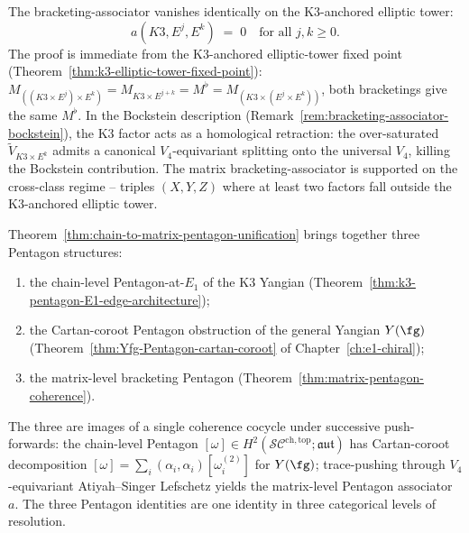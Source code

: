 \begin{remark}
\label{rem:K3-anchored-bracketing-rigidity}
The bracketing-associator vanishes identically on the K$3$-anchored
elliptic tower:
\[
 a(K3, E^j, E^k) \;=\; 0 \quad \text{for all } j, k \geq 0.
\]
The proof is immediate from the K$3$-anchored elliptic-tower fixed
point \textup{(}Theorem~\ref{thm:k3-elliptic-tower-fixed-point}\textup{):}
$M_{((K3 \times E^j) \times E^k)} = M_{K3 \times E^{j + k}} = M^\flat
= M_{(K3 \times (E^j \times E^k))}$, both bracketings give the same
$M^\flat$. In the Bockstein description
\textup{(}Remark~\ref{rem:bracketing-associator-bockstein}\textup{),}
the K$3$ factor acts as a homological retraction: the over-saturated
$\widetilde{V}_{K3 \times E^k}$ admits a canonical $V_4$-equivariant
splitting onto the universal $V_4$, killing the Bockstein contribution.
The matrix bracketing-associator is supported on the cross-class
regime -- triples $(X, Y, Z)$ where at least two factors fall outside
the K$3$-anchored elliptic tower.
\end{remark}

\begin{remark}
\label{rem:three-pentagon-unification}
Theorem~\ref{thm:chain-to-matrix-pentagon-unification} brings together
three Pentagon structures:
\begin{enumerate}
\item the chain-level Pentagon-at-$E_1$ of the K$3$ Yangian
 \textup{(}Theorem~\ref{thm:k3-pentagon-E1-edge-architecture}\textup{);}
\item the Cartan-coroot Pentagon obstruction of the general
 Yangian $Y(\fg)$
 \textup{(}Theorem~\ref{thm:Yfg-Pentagon-cartan-coroot} of
 Chapter~\ref{ch:e1-chiral}\textup{);}
\item the matrix-level bracketing Pentagon
 \textup{(}Theorem~\ref{thm:matrix-pentagon-coherence}\textup{).}
\end{enumerate}
The three are images of a single coherence cocycle under successive
push-forwards: the chain-level Pentagon $[\omega] \in
H^2(\mathcal{SC}^{\mathrm{ch, top}}; \mathfrak{aut})$ has Cartan-coroot
decomposition $[\omega] = \sum_i (\alpha_i, \alpha_i) [\omega^{(2)}_i]$
for $Y(\fg)$; trace-pushing through $V_4$-equivariant
Atiyah--Singer Lefschetz yields the matrix-level Pentagon associator
$a$. The three Pentagon identities are one identity in three
categorical levels of resolution.
\end{remark}


